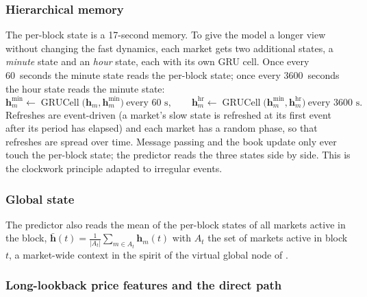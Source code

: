 \subsubsection{Hierarchical memory}
\label{sec:models:memory}

The per-block state is a 17-second memory.  To give the model a longer view without
changing the fast dynamics, each market gets two additional states, a \emph{minute}
state and an \emph{hour} state, each with its own GRU cell.  Once every 60~seconds the
minute state reads the per-block state; once every 3600~seconds the hour state reads
the minute state:
\begin{equation}
  \mathbf{h}^{\min}_m \leftarrow \operatorname{GRUCell}\bigl(\mathbf{h}_m, \mathbf{h}^{\min}_m\bigr)
  \ \text{every 60 s}, \qquad
  \mathbf{h}^{\mathrm{hr}}_m \leftarrow \operatorname{GRUCell}\bigl(\mathbf{h}^{\min}_m, \mathbf{h}^{\mathrm{hr}}_m\bigr)
  \ \text{every 3600 s}.
  \label{eq:memory}
\end{equation}  Refreshes are event-driven (a market's slow state is refreshed at
its first event after its period has elapsed) and each market has a random phase, so
that refreshes are spread over time.  Message passing and the book update only ever
touch the per-block state; the predictor reads the three states side by side.  This
is the clockwork principle \cite{koutnik2014clockwork} adapted to irregular events.

\subsubsection{Global state}

The predictor also reads the mean of the per-block states of all markets active in the
block, $\bar{\mathbf{h}}(t) = \frac{1}{|A_t|} \sum_{m \in A_t} \mathbf{h}_m(t)$ with $A_t$
the set of markets active in block $t$, a market-wide context in the spirit of the
virtual global node of \textcite{feldman2026navis}.

\subsubsection{Long-lookback price features and the direct path}
\label{sec:models:lookback}
\label{sec:models:skip}

